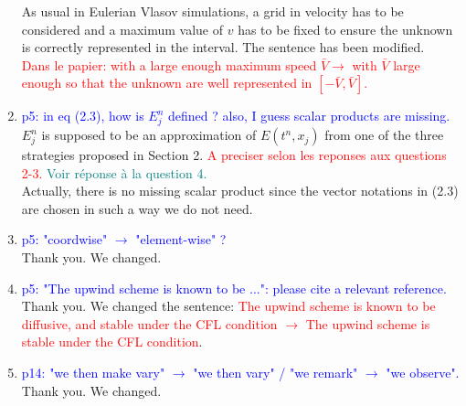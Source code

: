 \documentclass{article}
\begin{document}
\begin{enumerate}
        As usual in Eulerian Vlasov simulations, a grid in velocity has to be considered and a maximum value of $v$ has to be fixed 
        to ensure the unknown is correctly represented in the interval. The sentence has been modified. \\
        \textcolor{red}{Dans le papier: with a large enough maximum speed $\bar{V} \to$  with $\bar{V}$ large enough so that the unknown are well represented in 
        $[-\bar{V}, \bar{V}]$. }
        \item \textcolor{blue}{p5: in eq (2.3), how is $E^n_j$ defined ? also, I guess scalar products are missing. }\\ 
$E^n_j$ is supposed to be an approximation of $E(t^n, x_j)$ from one of the three strategies proposed in Section 2.  \textcolor{red}{A preciser selon les reponses aux questions 2-3.} \textcolor{teal}{Voir réponse à la question 4.}
\\
Actually, there is no missing scalar product since the vector notations in (2.3) are chosen in such a way we do not need.  
\item \textcolor{blue}{p5: "coordwise" $\to$ "element-wise" ?}\\
        Thank you. We changed. 
\item \textcolor{blue}{p5: "The upwind scheme is known to be ...": please cite a relevant reference. }\\ 
      Thank you. We changed the sentence: \textcolor{red}{ The upwind scheme is known to be diffusive, and stable under the CFL condition $\to$ The upwind scheme is stable under the CFL condition}. 
\item \textcolor{blue}{p14: "we then make vary" $\to$ "we then vary" / "we remark" $\to$ "we observe". }\\
       Thank you. We changed. 
\end{enumerate}

%
%
\end{document}

